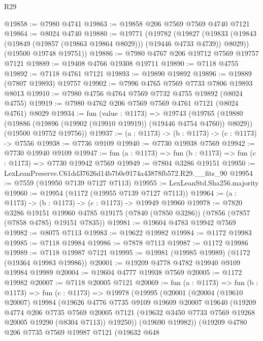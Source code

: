 \begin{lexlean}{R29}
\begin{coremodule}
@19858 := @7980 @4741
@19863 := @19858 @206 @7569 @7569 @4740 @7121
@19864 := @8024 @4740
@19880 := @19771
    (@19782
      (@19827 (@19833 (@19843 (@19849 (@19857 (@19863 @19864 @8029))) (@19446 @4733 @4739)) @8029))
      (@19500 @19748 @19751))
@19886 := @7980 @4767 @206 @19712 @7569 @19757 @7121
@19889 := @19408 @4766 @19308 @19711
@19890 := @7118 @4755
@19892 := @7118 @4761 @7121
@19893 := @19890 @19892
@19896 := @19889 (@7807 @19893) @19757
@19902 := @7996 @4765 @7569 @7733 @7806 @19893 @8013
@19910 := @7980 @4756 @4764 @7569 @7732 @4755 @19892 (@8024 @4755)
@19919 := @7980 @4762 @206 @7569 @7569 @4761 @7121 (@8024 @4761) @8029
@19934 := fun (value : @1173) =>
  @19743
    (@19765
      (@19880 (@19886 (@19896 (@19902 (@19910 @19919)) (@19446 @4754 @4760)) @8029))
      (@19500 @19752 @19756))
@19937 := (a : @1173) -> (b : @1173) -> (c : @1173) -> @7556
@19938 := @7736 @9109
@19940 := @7730 @19938 @7569
@19942 := @7730 @19940 @9109
@19947 := fun (a : @1173) => fun (b : @1173) => fun (c : @1173) => @7730 @19942 @7569
@19949 := @7804 @3286 @19151
@19950 := LexLeanPreserve.C61dd37626d14b7b0e9174a43878fb572.R29.__fits_90
@19954 := @7559 (@19950 @7139 @7127 @7113)
@19955 := LexLeanStd.Sha256.majority
@19960 := @19954 (@1172 (@19955 @7139 @7127 @7113))
@19964 := (a : @1173) -> (b : @1173) -> (c : @1173) -> @19949 @19960
@19978 := @7820
    @3286
    @19151
    @19960
    @4785
    @19175
    (@7840 (@7850 @3286))
    (@7856 (@7857 (@7858 @4785) @19151 @7835))
@19981 := @19604 @4783 @19942 @7569
@19982 := @8075 @7113
@19983 := @19622 @19982
@19984 := @1172 @19983
@19985 := @7118 @19984
@19986 := @7878 @7113
@19987 := @1172 @19986
@19989 := @7118 @19987 @7121
@19995 := @19981 (@19985 @19989) (@1172 (@19364 @19983 @19986))
@20001 := @19209 @4778 @4782 @19940 @9109 @19984 @19989
@20004 := @19604 @4777 @19938 @7569
@20005 := @1172 @19982
@20007 := @7118 @20005 @7121
@20069 := fun (a : @1173) =>
  fun (b : @1173) =>
  fun (c : @1173) =>
  @19978
    (@19995
      (@20001
        (@20004
          (@19610 @20007)
          @19984
          (@19626
            @4776
            @7735
            @9109
            @19609
            @20007
            @19640
            (@19209
              @4774
              @206
              @7735
              @7569
              @20005
              @7121
              (@19632 @3450 @7733 @7569 @19268 @20005 @19290 (@8304 @7113))
              @19250))
          (@19690 @19982))
        (@19209
          @4780
          @206
          @7735
          @7569
          @19987
          @7121
          (@19632
            @648

\end{coremodule}
\end{lexlean}
